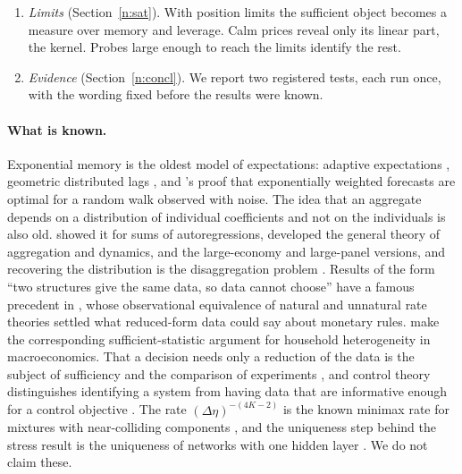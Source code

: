 \documentclass[12pt]{article}
\theoremstyle{definition}
\theoremstyle{remark}
\begin{document}
\begin{enumerate}[label=(\arabic*),leftmargin=*,itemsep=2pt]
\item \emph{Limits} (Section~\ref{n:sat}). With position limits the sufficient object becomes a measure over memory and leverage. Calm prices reveal only its linear part, the kernel. Probes large enough to reach the limits identify the rest.
\item \emph{Evidence} (Section~\ref{n:concl}). We report two registered tests, each run once, with the wording fixed before the results were known.
\end{enumerate}

\paragraph{What is known.} Exponential memory is the oldest model of expectations: adaptive expectations \citep{cagan1956,nerlove1958}, geometric distributed lags \citep{koyck1954}, and \citet{muth1960}'s proof that exponentially weighted forecasts are optimal for a random walk observed with noise. The idea that an aggregate depends on a distribution of individual coefficients and not on the individuals is also old. \citet{granger1980} showed it for sums of autoregressions, \citet{forni1997} developed the general theory of aggregation and dynamics, \citet{zaffaroni2004} and \citet{pesaran2014} the large-economy and large-panel versions, and recovering the distribution is the disaggregation problem \citep{celov2008}. Results of the form ``two structures give the same data, so data cannot choose'' have a famous precedent in \citet{sargent1976}, whose observational equivalence of natural and unnatural rate theories settled what reduced-form data could say about monetary rules. \citet{auclert2024} make the corresponding sufficient-statistic argument for household heterogeneity in macroeconomics. That a decision needs only a reduction of the data is the subject of sufficiency and the comparison of experiments \citep{blackwell1953,lecam1964}, and control theory distinguishes identifying a system from having data that are informative enough for a control objective \citep{vanwaarde2020}. The rate $(\Delta\eta)^{-(4K-2)}$ is the known minimax rate for mixtures with near-colliding components \citep{heinrich2018,wu2020}, and the uniqueness step behind the stress result is the uniqueness of networks with one hidden layer \citep{sussmann1992}. We do not claim these.
\end{document}
